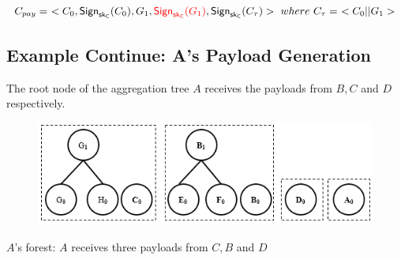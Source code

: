 \documentclass[%
  slidesonly,%
  semlayer%
  ]{seminar}                                  %
\newcommand{\sk}{\sf{sk}}
\begin{document}
\begin{slide}
      \begin{tiny}
        \begin{equation*}
          \begin{array}{l}
            C_{pay} =\ <C_{0},\textsf{Sign}_{\sk_{C}}(C_{0}),G_{1},\textcolor{red}{\textsf{Sign}_{\sk_{C}}(G_{1})}, \textsf{Sign}_{\sk_{C}}(C_{\tau})>\ where\ C_{\tau} =\ <C_{0} || G_{1}>\\
          \end{array}
        \end{equation*}
      \end{tiny}

      \vfill
      \clearpage

    \subsection*{Example Continue: A's Payload Generation}  

      The root node of the aggregation tree $A$ receives the payloads from $B,C$ and $D$ respectively.
      
      \begin{figure}[h!]
        \centering
        \includegraphics[scale = 0.5]{images/a-forest.png}
      \end{figure}
      \begin{center}
      \begin{small}
        \center
        $A$'s forest: $A$ receives three payloads from $C,B$ and $D$
      \end{small}
      \end{center}
      
      \vfill
      \clearpage


\end{slide}
\end{document}
